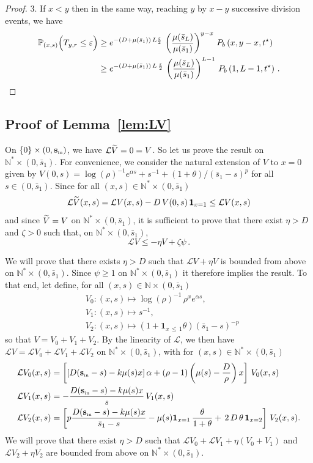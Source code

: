 \documentclass[10pt]{amsart}
\theoremstyle{definition}\newtheorem{defi}[theo]{Definition}\newtheorem{rema}[theo]{Remark}\newtheorem{exam}[theo]{Example}\newtheorem{exem}[theo]{Example}\newtheorem{nota}[theo]{Notation}
\newcommand{\PP}{\mathbb{P}}
\newcommand{\NN}{\mathbb{N}}
\newcommand{\clL}{\mathcal{L}}
\newcommand{\Sin}{{\mathbf s}_{\textrm{\tiny\rm in}}}
\newcommand{\barmu}{\mu(\bar s_1)}
\newcommand{\1}{\mathbf{1}}
\let\oldtilde\tilde
\renewcommand*{\tilde}[1]{\mathchoice{\widetilde{#1}}{\widetilde{#1}}{\oldtilde{#1}}{\oldtilde{#1}}}
\begin{document}
\begin{proof}
3. If $x<y$ then in the same way, reaching $y$ by $x-y$ successive division events, we have
\begin{align*}
\PP_{(x,s)}
\Big(T_{y,r} \leq \varepsilon\Big) &
\geq e^{-(D+\barmu)\,L\frac{\varepsilon}{2}}\, \left(\frac{\mu(\bar s_L)}{\barmu}\right)^{y-x}
\,P_b\left(x,y-x, t^\star\right)
\\
&
\geq e^{-(D+\barmu)\,L\,\frac{\varepsilon}{2}}\, \left(\frac{\mu(\bar s_L)}{\barmu}\right)^{L-1}
\,P_b\left(1,L-1, t^\star\right)\,.\qedhere
\end{align*}
\end{proof}



\subsection{Proof of Lemma~\ref{lem:LV}}\label{sec:proof.lem.LV}


On $\{0\}\times (0,\Sin)$, we have $\clL\tilde V=0=V$. So let us prove the result on $\NN^* \times (0,\bar s_1)$. For convenience, we consider the natural extension of $V$ to $x=0$ given by $V(0,s)= \log(\rho)^{-1} e^{\alpha s} + s^{-1} + (1+\theta)/(\bar s_1-s)^{p}$ for all $s\in (0,\bar s_1)$. Since for all $(x,s)\in \NN^* \times (0,\bar s_1)$
\[
\clL\tilde V(x,s) = \clL V(x,s) - D\,V(0,s)\,\1_{x=1}\leq \clL V(x,s)
\]
and since $\tilde V=V$ on $\NN^* \times (0,\bar s_1)$, it is sufficient to prove that there exist $\eta>D$ and $\zeta>0$ such that, on $\NN^* \times (0,\bar s_1)$,
\[
\clL V \leq -\eta V + \zeta \psi\,.
\]

We will prove that there exists $\eta>D$ such that $\clL V + \eta V$ is bounded from above on $\NN^* \times (0,\bar s_1)$. Since $\psi \geq 1$ on $\NN^* \times (0,\bar s_1)$ it therefore implies the result. To that end, let define, for all $(x,s)\in \NN \times (0,\bar s_1)$
\begin{align*}
&V_0:(x,s)\mapsto \log(\rho)^{-1}\,\rho^x e^{\alpha s},
\\
&V_1:(x,s)\mapsto s^{-1},
\\ &V_2:(x,s)\mapsto \left(1+\1_{x\,\leq\,1}\theta\right) \left(\bar{s}_1-s\right)^{-p}
\end{align*}
so that $V=V_0+V_1+V_2$. By the linearity of $\clL$, we then have $\clL V=\clL V_0+\clL V_1+\clL V_2$ on $\NN^* \times (0,\bar s_1)$, with for $(x,s)\in \NN^* \times (0,\bar s_1)$
\begin{align*}
\clL V_0(x,s) &=\left[\left[D(\Sin - s)- k \mu(s) x\right] \alpha + (\rho-1)\left(\mu(s)-\frac{D}{\rho}\right) x\right]\,V_0(x,s) \\
\clL V_1(x,s) & = -\frac{D(\Sin - s)- k \mu(s) x }{s}\,V_1(x,s)\\
\clL V_2(x,s) &=\left[p \frac{D(\Sin - s)- k \mu(s)x }{\bar{s}_1-s} -\mu(s)\1_{x= 1}\,\frac{\theta}{1+\theta}+\,2\,D\,\theta\,\1_{x= 2}\right]\,V_2(x,s).
\end{align*}
We will prove that there exist $\eta>D$ such that $\clL V_0 + \clL V_1+ \eta (V_0+V_1)$ and $\clL V_2 + \eta V_2$ are bounded from above on $\NN^* \times (0,\bar s_1)$.
\end{document}
